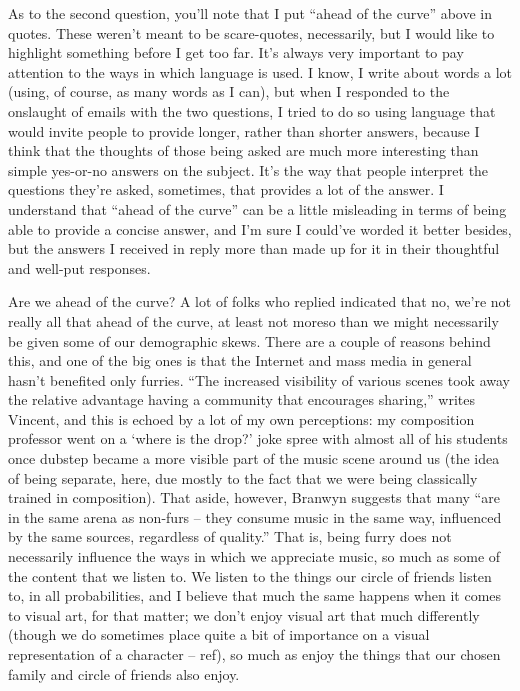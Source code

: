 As to the second question, you'll note that I put ``ahead of the curve'' above in quotes. These weren't meant to be scare-quotes, necessarily, but I would like to highlight something before I get too far. It's always very important to pay attention to the ways in which language is used. I know, I write about words a lot (using, of course, as many words as I can), but when I responded to the onslaught of emails with the two questions, I tried to do so using language that would invite people to provide longer, rather than shorter answers, because I think that the thoughts of those being asked are much more interesting than simple yes-or-no answers on the subject. It's the way that people interpret the questions they're asked, sometimes, that provides a lot of the answer. I understand that ``ahead of the curve'' can be a little misleading in terms of being able to provide a concise answer, and I'm sure I could've worded it better besides, but the answers I received in reply more than made up for it in their thoughtful and well-put responses.

Are we ahead of the curve? A lot of folks who replied indicated that no, we're not really all that ahead of the curve, at least not moreso than we might necessarily be given some of our demographic skews. There are a couple of reasons behind this, and one of the big ones is that the Internet and mass media in general hasn't benefited only furries. ``The increased visibility of various scenes took away the relative advantage having a community that encourages sharing,'' writes Vincent, and this is echoed by a lot of my own perceptions: my composition professor went on a `where is the drop?' joke spree with almost all of his students once dubstep became a more visible part of the music scene around us (the idea of being separate, here, due mostly to the fact that we were being classically trained in composition). That aside, however, Branwyn suggests that many ``are in the same arena as non-furs -- they consume music in the same way, influenced by the same sources, regardless of quality.'' That is, being furry does not necessarily influence the ways in which we appreciate music, so much as some of the content that we listen to. We listen to the things our circle of friends listen to, in all probabilities, and I believe that much the same happens when it comes to visual art, for that matter; we don't enjoy visual art that much differently (though we do sometimes place quite a bit of importance on a visual representation of a character -- ref), so much as enjoy the things that our chosen family and circle of friends also enjoy.

